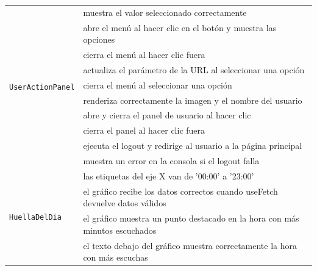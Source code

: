 \begin{longtable}{|p{5cm}|p{9cm}|}
  \multirow{10}{*}{\texttt{UserActionPanel}}      & muestra el valor seleccionado correctamente                                  \\ \cline{2-2}
                                                  & abre el menú al hacer clic en el botón y muestra las opciones                \\ \cline{2-2}
                                                  & cierra el menú al hacer clic fuera                                           \\ \cline{2-2}
                                                  & actualiza el parámetro de la URL al seleccionar una opción                   \\ \cline{2-2}
                                                  & cierra el menú al seleccionar una opción                                     \\ \cline{2-2}
                                                  & renderiza correctamente la imagen y el nombre del usuario                    \\ \cline{2-2}
                                                  & abre y cierra el panel de usuario al hacer clic                              \\ \cline{2-2}
                                                  & cierra el panel al hacer clic fuera                                          \\ \cline{2-2}
                                                  & ejecuta el logout y redirige al usuario a la página principal                \\ \cline{2-2}
                                                  & muestra un error en la consola si el logout falla                            \\ \hline

  \multirow{4}{*}{\texttt{HuellaDelDia}}          & las etiquetas del eje X van de '00:00' a '23:00'                             \\ \cline{2-2}
                                                  & el gráfico recibe los datos correctos cuando useFetch devuelve datos válidos \\ \cline{2-2}
                                                  & el gráfico muestra un punto destacado en la hora con más minutos escuchados  \\ \cline{2-2}
                                                  & el texto debajo del gráfico muestra correctamente la hora con más escuchas   \\ \hline


\end{longtable}

